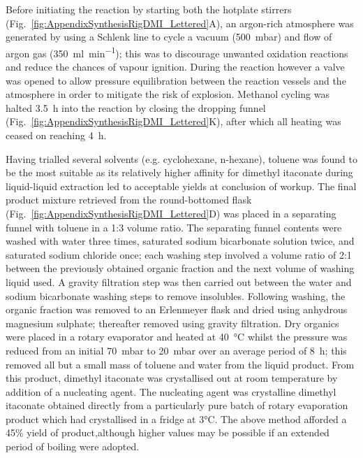 Before initiating the reaction by starting both the hotplate stirrers
 (Fig.~\ref{fig:AppendixSynthesisRigDMI_Lettered}A), an argon-rich atmosphere was
 generated by using a Schlenk line to cycle a vacuum (500~\unit{\milli\bar})
 and flow of argon gas (350~\unit{\milli\litre\per\minute}); this was to 
 discourage unwanted oxidation reactions and reduce the chances of vapour 
 ignition.
During the reaction however a valve was opened to allow pressure 
 equilibration between the reaction vessels and the atmosphere in order to
 mitigate the risk of explosion.
Methanol cycling was halted 3.5~\unit{\hour} into the reaction by closing 
 the dropping funnel (Fig.~\ref{fig:AppendixSynthesisRigDMI_Lettered}K), after
 which all heating was ceased on reaching 4~\unit{\hour}.

Having trialled several solvents (e.g. cyclohexane, n-hexane), toluene 
 was found to be the most suitable as its relatively higher affinity for 
 dimethyl itaconate during liquid-liquid extraction led to acceptable
 yields at conclusion of workup.
The final product mixture retrieved from the round-bottomed flask
 (Fig.~\ref{fig:AppendixSynthesisRigDMI_Lettered}D) was placed in a separating funnel
 with toluene in a 1:3 volume ratio.
The separating funnel contents were washed with water three times, saturated
 sodium bicarbonate solution twice, and saturated sodium chloride once;
 each washing step involved a volume ratio of 2:1 between the previously
 obtained organic fraction and the next volume of washing liquid used.
A gravity filtration step was then carried out between the water and sodium
 bicarbonate washing steps to remove insolubles.
Following washing, the organic fraction was removed to an Erlenmeyer flask
 and dried using anhydrous magnesium sulphate; thereafter removed using
 gravity filtration.
Dry organics were placed in a rotary evaporator and heated at
 40~\unit{\degreeCelsius} whilst the pressure was reduced from an initial
 70~\unit{\milli\bar} to 20~\unit{\milli\bar} over an average period of
 8~\unit{\hour}; this removed all but a small mass of toluene and water
 from the liquid product.
From this product, dimethyl itaconate was crystallised out at room
 temperature by addition of a nucleating agent.
The nucleating agent was crystalline dimethyl itaconate obtained directly
 from a particularly pure batch of rotary evaporation product which had
 crystallised in a fridge at 3\unit{\degreeCelsius}.
The above method afforded a 45\unit{\percent} yield of product,although 
 higher values may be possible if an extended period of boiling were 
 adopted.

